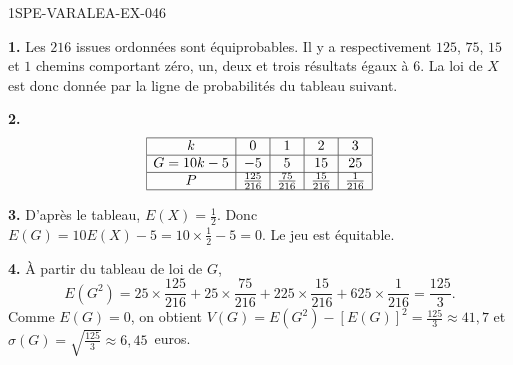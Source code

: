 \begin{corrige}{1SPE-VARALEA-EX-046}

\textbf{1.} Les $216$ issues ordonnées sont équiprobables. Il y a respectivement
$125$, $75$, $15$ et $1$ chemins comportant zéro, un, deux et trois résultats
égaux à $6$. La loi de $X$ est donc donnée par la ligne de probabilités du tableau suivant.

\medskip
\textbf{2.}
\[
\begin{array}{|c|c|c|c|c|}
\hline
k & 0 & 1 & 2 & 3 \\
\hline
G = 10k-5 & -5 & 5 & 15 & 25 \\
\hline
P & \frac{125}{216} & \frac{75}{216} & \frac{15}{216} & \frac{1}{216} \\
\hline
\end{array}
\]

\medskip
\textbf{3.} D'après le tableau, $E(X)=\frac12$. Donc
$E(G)=10E(X)-5=10\times\frac12-5=0$. Le jeu est équitable.

\medskip
\textbf{4.} À partir du tableau de loi de $G$,
\[
E(G^2)=25\times\frac{125}{216}+25\times\frac{75}{216}
+225\times\frac{15}{216}+625\times\frac{1}{216}=\frac{125}{3}.
\]
Comme $E(G)=0$, on obtient $V(G)=E(G^2)-[E(G)]^2=\frac{125}{3}
\approx41{,}7$ et $\sigma(G)=\sqrt{\frac{125}{3}}\approx6{,}45$~euros.

\end{corrige}
